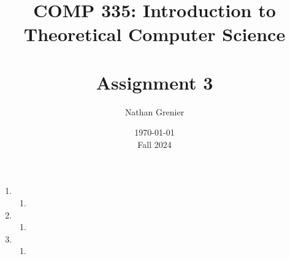 \documentclass[12pt]{article}
\title{COMP 335: Introduction to Theoretical Computer Science\\
\ \\
Assignment 3}
\author{Nathan Grenier}
\date{\today \\ Fall 2024}
\begin{document}
\begin{spacing}{1.5}
      \maketitle

      \newpage

      \begin{enumerate}

            \item[1.] [20 Points]

                  \begin{enumerate}
                        \item

                  \end{enumerate}

                  \newpage
            \item[2.] [20 Points]

                  \begin{enumerate}
                        \item
                  \end{enumerate}

                  \newpage
            \item[3.] [20 Points]

                  \begin{enumerate}
                        \item
                  \end{enumerate}

      \end{enumerate}

\end{spacing}
\end{document}
